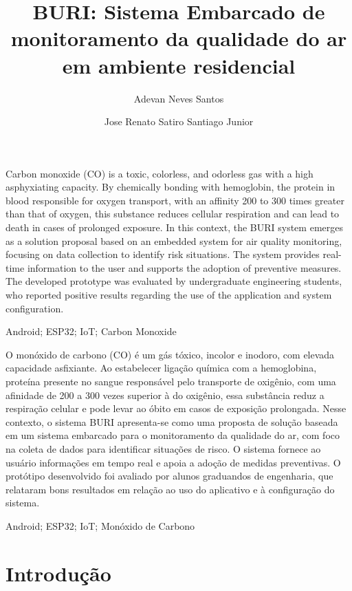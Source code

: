 \documentclass[alpha-refs,brazilian]{RBCA_v3.0}
\title{BURI: Sistema Embarcado de monitoramento da qualidade do ar em ambiente residencial}
\author[1]{Adevan Neves Santos \orcid{0009-0006-2716-5958}}
\author[1]{Jose Renato Satiro Santiago Junior \orcid{0000-0000-0000-0000}}
\affil[1]{Universidade do Estado do Amazonas}
\begin{document}
\begin{frontmatter}
	
\maketitle
\thispagestyle{empty}

\begin{Abstract} %
	Carbon monoxide (CO) is a toxic, colorless, and odorless gas with a high asphyxiating capacity. By chemically bonding with hemoglobin, the protein in blood responsible for oxygen transport, with an affinity 200 
	to 300 times greater than that of oxygen, this substance reduces cellular respiration and can lead to death in cases of prolonged exposure. In this context, the BURI system emerges as a solution proposal based 
	on an embedded system for air quality monitoring, focusing on data collection to identify risk situations. The system provides real-time information to the user and supports the adoption of preventive measures. 
	The developed prototype was evaluated by undergraduate engineering students, who reported positive results regarding the use of the application and system configuration.
\end{Abstract}

\begin{keywords}
	Android; ESP32; IoT; Carbon Monoxide
\end{keywords}

\begin{resumo} %
	O monóxido de carbono (CO) é um gás tóxico, incolor e inodoro, com elevada capacidade asfixiante. Ao estabelecer ligação química com a hemoglobina, proteína presente no sangue responsável pelo transporte de oxigênio, 
	com uma afinidade de 200 a 300 vezes superior à do oxigênio, essa substância reduz a respiração celular e pode levar ao óbito em casos de exposição prolongada. Nesse contexto, o sistema BURI apresenta-se como uma proposta 
	de solução baseada em um sistema embarcado para o monitoramento da qualidade do ar, com foco na coleta de dados para identificar situações de risco. O sistema fornece ao usuário informações em tempo real e apoia a adoção de 
	medidas preventivas. O protótipo desenvolvido foi avaliado por alunos graduandos de engenharia, que relataram bons resultados em relação ao uso do aplicativo e à configuração do sistema.
\end{resumo}

\begin{palavras_chave} %
	Android; ESP32; IoT; Monóxido de Carbono
\end{palavras_chave}

\end{frontmatter}

\section{Introdução}

 
\end{document}
